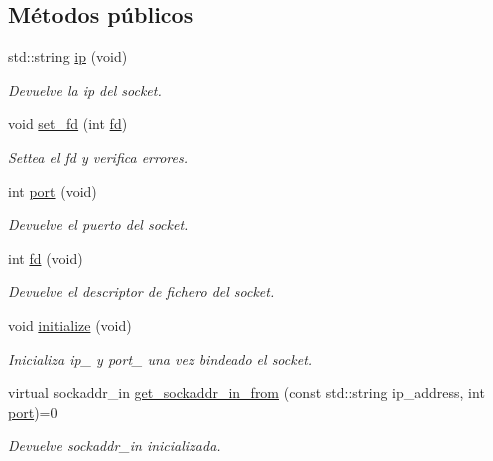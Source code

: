 \subsection*{Métodos públicos}
\begin{DoxyCompactItemize}
\item 
std\+::string \hyperlink{classSocket__base_aed490170422026c6dfe5def12031cd04}{ip} (void)
\begin{DoxyCompactList}\small\item\em Devuelve la ip del socket. \end{DoxyCompactList}\item 
\mbox{\label{classSocket__base_ad70da7f9fc273f0f2fa847447c292038}} 
void \hyperlink{classSocket__base_ad70da7f9fc273f0f2fa847447c292038}{set\+\_\+fd} (int \hyperlink{classSocket__base_a740aedbac3269e4981732dd6842cd9c2}{fd})
\begin{DoxyCompactList}\small\item\em Settea el fd y verifica errores. \end{DoxyCompactList}\item 
int \hyperlink{classSocket__base_afcdd7ae81a9fb867d012b7db8c259576}{port} (void)
\begin{DoxyCompactList}\small\item\em Devuelve el puerto del socket. \end{DoxyCompactList}\item 
\mbox{\label{classSocket__base_a740aedbac3269e4981732dd6842cd9c2}} 
int \hyperlink{classSocket__base_a740aedbac3269e4981732dd6842cd9c2}{fd} (void)
\begin{DoxyCompactList}\small\item\em Devuelve el descriptor de fichero del socket. \end{DoxyCompactList}\item 
void \hyperlink{classSocket__base_af0b9f713f4d6231c287198034fad662e}{initialize} (void)
\begin{DoxyCompactList}\small\item\em Inicializa ip\+\_\+ y port\+\_\+ una vez bindeado el socket. \end{DoxyCompactList}\item 
virtual sockaddr\+\_\+in \hyperlink{classSocket__base_a887249ae6a25693230c0febf403a2545}{get\+\_\+sockaddr\+\_\+in\+\_\+from} (const std\+::string ip\+\_\+address, int \hyperlink{classSocket__base_afcdd7ae81a9fb867d012b7db8c259576}{port})=0
\begin{DoxyCompactList}\small\item\em Devuelve sockaddr\+\_\+in inicializada. \end{DoxyCompactList}\end{DoxyCompactItemize}


